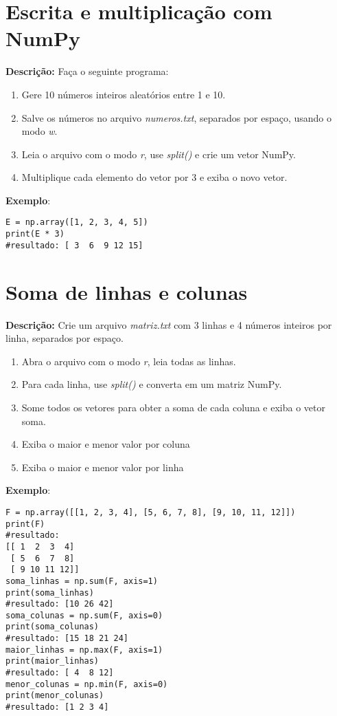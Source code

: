 \section{Escrita e multiplicação com NumPy}

\textbf{Descrição:} Faça o seguinte programa:

\begin{enumerate}
    \item Gere 10 números inteiros aleatórios entre 1 e 10.
    \item Salve os números no arquivo \textit{numeros.txt}, separados por espaço, usando o modo \textit{w}.
    \item Leia o arquivo com o modo \textit{r}, use \textit{split()} e crie um vetor NumPy.
    \item Multiplique cada elemento do vetor por 3 e exiba o novo vetor.
\end{enumerate}

\textbf{Exemplo}:
\begin{verbatim}
E = np.array([1, 2, 3, 4, 5])
print(E * 3)
#resultado: [ 3  6  9 12 15]
\end{verbatim}

\section{Soma de linhas e colunas}

\textbf{Descrição:} Crie um arquivo \textit{matriz.txt} com 3 linhas e 4 números inteiros por linha, separados por espaço.

\begin{enumerate}
    \item Abra o arquivo com o modo \textit{r}, leia todas as linhas.
    \item Para cada linha, use \textit{split()} e converta em um matriz NumPy.
    \item Some todos os vetores para obter a soma de cada coluna e exiba o vetor soma.
    \item Exiba o maior e menor valor por coluna
    \item Exiba o maior e menor valor por linha
\end{enumerate}

\textbf{Exemplo}:
\begin{verbatim}
F = np.array([[1, 2, 3, 4], [5, 6, 7, 8], [9, 10, 11, 12]])
print(F)
#resultado: 
[[ 1  2  3  4]
 [ 5  6  7  8]
 [ 9 10 11 12]]
soma_linhas = np.sum(F, axis=1)
print(soma_linhas)
#resultado: [10 26 42]
soma_colunas = np.sum(F, axis=0)
print(soma_colunas)
#resultado: [15 18 21 24]
maior_linhas = np.max(F, axis=1)
print(maior_linhas)
#resultado: [ 4  8 12]
menor_colunas = np.min(F, axis=0)
print(menor_colunas)
#resultado: [1 2 3 4]
\end{verbatim}

